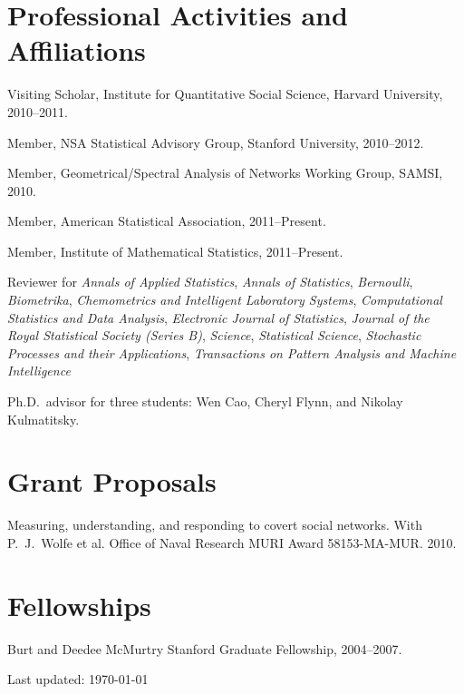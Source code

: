 \documentclass[10pt,letterpaper]{article}
\renewenvironment{itemize}{
  \begin{list}{}{
    \setlength{\leftmargin}{1.5em}
    \setlength{\itemsep}{0.25em}
    \setlength{\parskip}{0pt}
    \setlength{\parsep}{0.25em}
  }
}{
  \end{list}
}
\begin{document}
\section*{Professional Activities and Affiliations}
\begin{itemize}
\item Visiting Scholar, Institute for Quantitative Social Science, Harvard University, 2010--2011.
\item Member, NSA Statistical Advisory Group, Stanford University, 2010--2012.
\item Member, Geometrical/Spectral Analysis of Networks Working Group, SAMSI, 2010.
\item Member, American Statistical Association, 2011--Present.
\item Member, Institute of Mathematical Statistics, 2011--Present.
\item Reviewer for
  \textit{Annals of Applied Statistics},
  \textit{Annals of Statistics},
  \textit{Bernoulli},
  \textit{Biometrika},
  \textit{Chemometrics and Intelligent Laboratory Systems},
  \textit{Computational Statistics and Data Analysis},
  \textit{Electronic Journal of Statistics},
  \textit{Journal of the Royal Statistical Society (Series B)},
  \textit{Science},
  \textit{Statistical Science},
  \textit{Stochastic Processes and their Applications},
  \textit{Transactions on Pattern Analysis and Machine Intelligence}
\item Ph.D.~advisor for three students: Wen Cao, Cheryl Flynn, and Nikolay Kulmatitsky.
\end{itemize}




\section*{Grant Proposals}
\begin{itemize}
  \item Measuring, understanding, and responding to covert social networks.
  With P.~J.~Wolfe et al.
  Office of Naval Research MURI Award 58153-MA-MUR.
  2010.
\end{itemize}




\section*{Fellowships}

\begin{itemize}
\item Burt and Deedee McMurtry Stanford Graduate Fellowship, 2004--2007.
\end{itemize}

\medskip

\begin{center}
  \begin{small}
    Last updated: \today
  \end{small}
\end{center}


\end{document}
